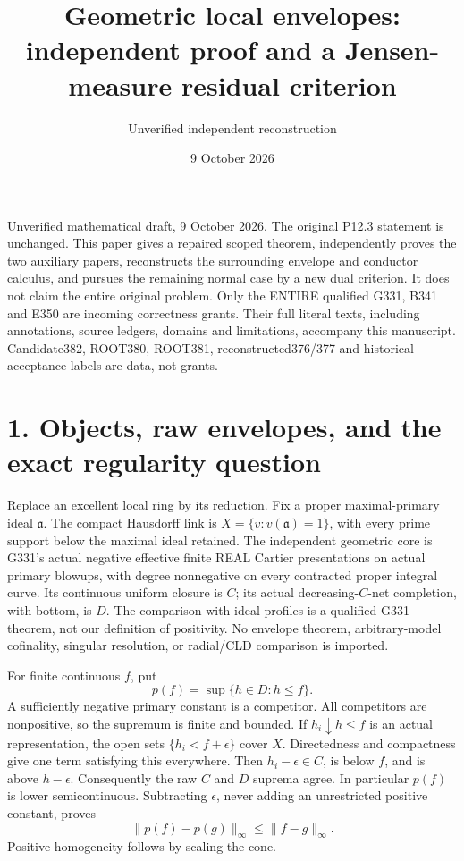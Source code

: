 \documentclass[11pt]{article}
\title{Geometric local envelopes: independent proof and a Jensen-measure residual criterion}
\author{Unverified independent reconstruction}
\date{9 October 2026}
\begin{document}
\maketitle

\tableofcontents

Unverified mathematical draft, 9 October 2026. The original P12.3 statement is unchanged. This paper gives a repaired scoped theorem, independently proves the two auxiliary papers, reconstructs the surrounding envelope and conductor calculus, and pursues the remaining normal case by a new dual criterion. It does not claim the entire original problem. Only the ENTIRE qualified G331, B341 and E350 are incoming correctness grants. Their full literal texts, including annotations, source ledgers, domains and limitations, accompany this manuscript. Candidate382, ROOT380, ROOT381, reconstructed376/377 and historical acceptance labels are data, not grants.

\section{1. Objects, raw envelopes, and the exact regularity question}

Replace an excellent local ring by its reduction. Fix a proper maximal-primary ideal \(\mathfrak a\). The compact Hausdorff link is \(X=\{v:v(\mathfrak a)=1\}\), with every prime support below the maximal ideal retained. The independent geometric core is G331's actual negative effective finite REAL Cartier presentations on actual primary blowups, with degree nonnegative on every contracted proper integral curve. Its continuous uniform closure is \(C\); its actual decreasing-\(C\)-net completion, with bottom, is \(D\). The comparison with ideal profiles is a qualified G331 theorem, not our definition of positivity. No envelope theorem, arbitrary-model cofinality, singular resolution, or radial/CLD comparison is imported.

For finite continuous \(f\), put
\[
p(f)=\sup\{h\in D:h\le f\}.
\]
A sufficiently negative primary constant is a competitor. All competitors are nonpositive, so the supremum is finite and bounded. If \(h_i\downarrow h\le f\) is an actual representation, the open sets \(\{h_i<f+\epsilon\}\) cover \(X\). Directedness and compactness give one term satisfying this everywhere. Then \(h_i-\epsilon\in C\), is below \(f\), and is above \(h-\epsilon\). Consequently the raw \(C\) and \(D\) suprema agree. In particular \(p(f)\) is lower semicontinuous. Subtracting \(\epsilon\), never adding an unrestricted positive constant, proves
\[
\|p(f)-p(g)\|_\infty\le\|f-g\|_\infty.
\]
Positive homogeneity follows by scaling the cone.
\end{document}
